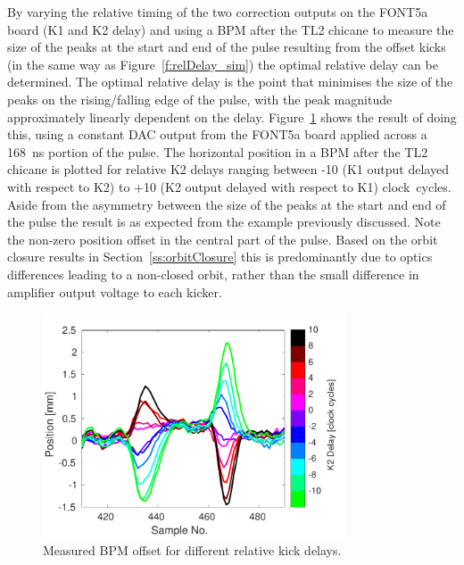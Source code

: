 By varying the relative timing of the two correction outputs on the FONT5a board (K1 and K2 delay) and using a BPM after the TL2 chicane to measure the size of the peaks at the start and end of the pulse resulting from the offset kicks (in the same way as Figure~\ref{f:relDelay_sim}) the optimal relative delay can be determined. The optimal relative delay is the point that minimises the size of the peaks on the rising/falling edge of the pulse, with the peak magnitude  approximately linearly dependent on the delay. Figure~\ref{f:relDelay_traces} shows the result of doing this, using a constant DAC output from the FONT5a board applied across a 168~ns portion of the pulse. The horizontal position in a BPM after the TL2 chicane is plotted for relative K2 delays ranging between -10 (K1 output delayed with respect to K2) to +10 (K2 output delayed with respect to K1) clock~cycles. Aside from the asymmetry between the size of the peaks at the start and end of the pulse the result is as expected from the example previously discussed. Note the non-zero position offset in the central part of the pulse. Based on the orbit closure results in Section~\ref{ss:orbitClosure} this is predominantly due to optics differences leading to a non-closed orbit, rather than the small difference in amplifier output voltage to each kicker.

\begin{figure}
  \centering
  \includegraphics[width=0.8\textwidth]{Figures/commissioning/relDelay_traces}
  \caption{Measured BPM offset for different relative kick delays.}
  \label{f:relDelay_traces}
\end{figure}

